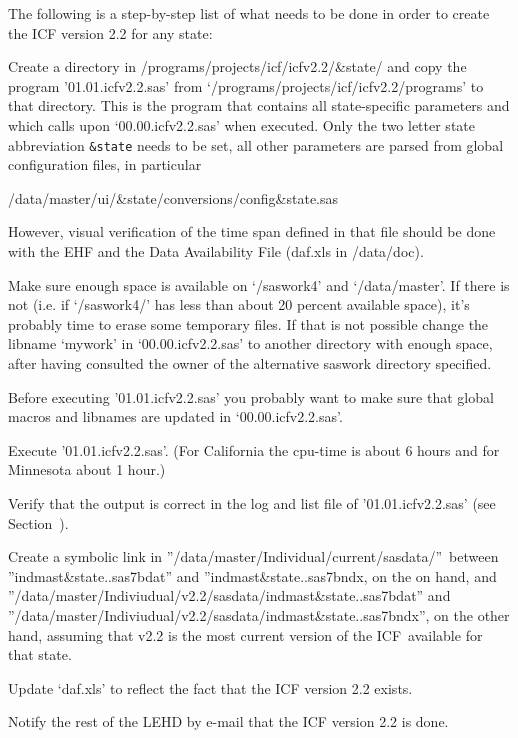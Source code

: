 \begin{description}
\item The following is a step-by-step list of what needs to be done in order
to create the ICF version 2.2 for any state:

\begin{steps}
\item Create a directory in /programs/projects/icf/icfv2.2/{\&}state/ and
copy the program '01.01.icfv2.2.sas' from
`/programs/projects/icf/icfv2.2/programs' to that directory. This is the
program that contains all state-specific parameters and which calls upon
`00.00.icfv2.2.sas' when executed. Only the two letter state abbreviation 
\texttt{{\&}state} needs to be set, all other parameters are parsed from
global configuration files, in particular

/data/master/ui/{\&}state/conversions/config{\&}state.sas

However, visual verification of the time span defined in that file should be
done with the EHF and the Data Availability File (daf.xls in /data/doc).

\item Make sure enough space is available on `/saswork4' and `/data/master'.
If there is not (i.e. if `/saswork4/' has less than about 20 percent
available space), it's probably time to erase some temporary files. If that
is not possible change the libname `mywork' in `00.00.icfv2.2.sas' to
another directory with enough space, after having consulted the owner of the
alternative saswork directory specified.

\item Before executing '01.01.icfv2.2.sas' you probably want to make sure
that global macros and libnames are updated in `00.00.icfv2.2.sas'.

\item Execute '01.01.icfv2.2.sas'. (For California the cpu-time is about 6
hours and for Minnesota about 1 hour.)

\item Verify that the output is correct in the log and list file of
'01.01.icfv2.2.sas' (see Section~).

\item Create a symbolic link in
''/data/master/Individual/current/sasdata/''\ between
''indmast\&state..sas7bdat'' and ''indmast\&state..sas7bndx, on the on hand,
and ''/data/master/Indiviudual/v2.2/sasdata/indmast\&state..sas7bdat'' and
''/data/master/Indiviudual/v2.2/sasdata/indmast\&state..sas7bndx'', on the
other hand, assuming that v2.2 is the most current version of the ICF\
available for that state.\ 

\item Update `daf.xls' to reflect the fact that the ICF version 2.2 exists.

\item Notify the rest of the LEHD by e-mail that the ICF version 2.2 is done.
\end{steps}
\end{description}

